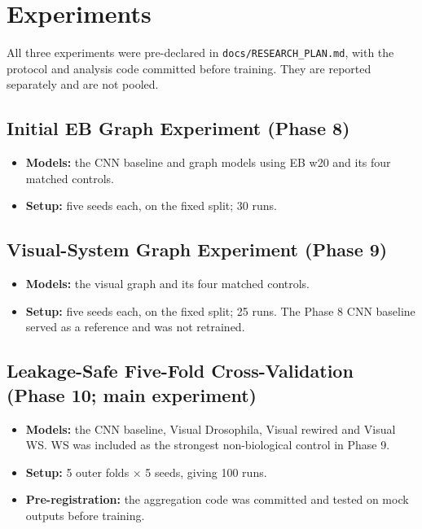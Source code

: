 \section{Experiments}
\label{sec:04_experiments}

All three experiments were pre-declared in \texttt{docs/RESEARCH\_PLAN.md}, with the protocol and analysis code committed before training. They are reported separately and are not pooled.

\subsection{Initial EB Graph Experiment (Phase 8)}

\begin{itemize}
\item \textbf{Models:} the CNN baseline and graph models using EB w20 and its four matched controls.
\item \textbf{Setup:} five seeds each, on the fixed split; 30 runs.
\end{itemize}

\subsection{Visual-System Graph Experiment (Phase 9)}

\begin{itemize}
\item \textbf{Models:} the visual graph and its four matched controls.
\item \textbf{Setup:} five seeds each, on the fixed split; 25 runs. The Phase 8 CNN baseline served as a reference and was not retrained.
\end{itemize}

\subsection{Leakage-Safe Five-Fold Cross-Validation (Phase 10; main experiment)}

\begin{itemize}
\item \textbf{Models:} the CNN baseline, Visual Drosophila, Visual rewired and Visual WS. WS was included as the strongest non-biological control in Phase 9.
\item \textbf{Setup:} 5 outer folds × 5 seeds, giving 100 runs.
\item \textbf{Pre-registration:} the aggregation code was committed and tested on mock outputs before training.
\end{itemize}
